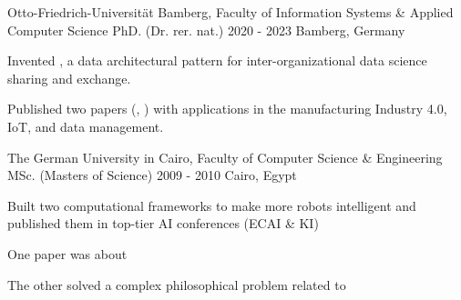 \begin{cventries}



  \cventry
    {Otto-Friedrich-Universit\"{a}t Bamberg, Faculty of Information Systems \& Applied Computer Science}  %
    {PhD. (Dr. rer. nat.)} %
    {2020 - 2023} %
    {Bamberg, Germany} %
    {	
      \begin{cvitems} %
		\item {Invented , a data architectural pattern for inter-organizational data science sharing and exchange.}
		\item {Published two papers (, ) with applications in the manufacturing Industry 4.0, IoT, and data management.}
    \end{cvitems}
    }
\vspace{4ex}


  \cventry
    {The German University in Cairo, Faculty of Computer Science \& Engineering}  %
    {MSc. (Masters of Science)} %
    {2009 - 2010} %
    {Cairo, Egypt} %
    {	
      \begin{cvitems} %
		\item {Built two computational frameworks to make more robots intelligent and published them in top-tier AI conferences (ECAI \& KI)}
		\item {One paper was about }
		\item {The other solved a complex philosophical problem related to }
    \end{cvitems}
    }
    
    
\vspace{4ex}




\end{cventries}
